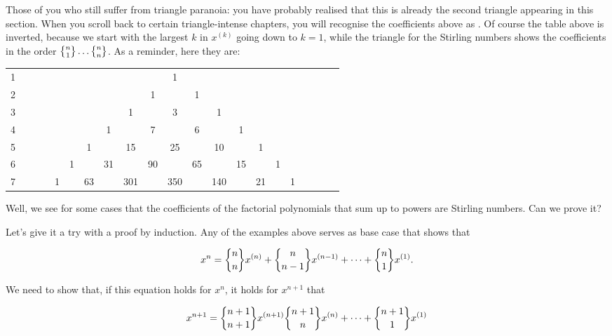 \documentclass[tikz]{scrreprt}
\begin{document}
Those of you who still suffer from triangle paranoia:
you have probably realised that this is already the second
triangle appearing in this section.
When you scroll back to certain triangle-intense chapters,
you will recognise the coefficients above as 
.
Of course the table above is inverted, because we start
with the largest $k$ in $x^{(k)}$ going down to $k=1$,
while the triangle for the Stirling numbers shows
the coefficients in the order 
$\stirlingTwo{n}{1} \dots \stirlingTwo{n}{n}$.
As a reminder, here they are:

\begin{tabular}{l c c c c c c c c c c c c c c c c c c c c}
1 &   &   &   &   &    &    &    &     &     &   1 &     &     &    &    &    &   &   &   &   &  \\
2 &   &   &   &   &    &    &    &     &   1 &     &   1 &     &    &    &    &   &   &   &   &  \\
3 &   &   &   &   &    &    &    &   1 &     &   3 &     &   1 &    &    &    &   &   &   &   &  \\
4 &   &   &   &   &    &    &  1 &     &   7 &     &   6 &     &  1 &    &    &   &   &   &   &  \\
5 &   &   &   &   &    &  1 &    &  15 &     &  25 &     &  10 &    &  1 &    &   &   &   &   &  \\
6 &   &   &   &   &  1 &    & 31 &     &  90 &     &  65 &     & 15 &    &  1 &   &   &   &   &  \\   
7 &   &   &   & 1 &    & 63 &    & 301 &     & 350 &     & 140 &    & 21 &    & 1 &   &   &   &  
\end{tabular}

Well, we see for some cases that the coefficients
of the factorial polynomials that sum up to powers are
Stirling numbers. Can we prove it?

Let's give it a try with a proof by induction.
Any of the examples above serves as base case that shows that

\begin{equation}
x^n = \stirlingTwo{n}{n}x^{(n)} + \stirlingTwo{n}{n-1}x^{(n-1)} + \dots + \stirlingTwo{n}{1}x^{(1)}.
\end{equation}

We need to show that, if this equation holds for $x^n$, it holds for $x^{n+1}$ that

\begin{equation}
x^{n+1} = \stirlingTwo{n+1}{n+1}x^{(n+1)}
          \stirlingTwo{n+1}{n}x^{(n)} + \dots + 
          \stirlingTwo{n+1}{1}x^{(1)}
\end{equation}
\end{document}
